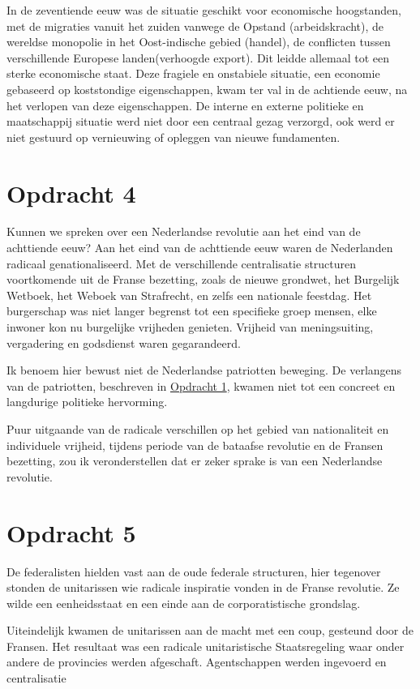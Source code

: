 \documentclass[11pt]{amsart}
\begin{document}
In de zeventiende eeuw was de situatie geschikt voor economische hoogstanden, met de migraties vanuit het zuiden vanwege de Opstand (arbeidskracht), de wereldse monopolie in het Oost-indische gebied (handel), de conflicten tussen verschillende Europese landen(verhoogde export). Dit leidde allemaal tot een sterke economische staat. Deze fragiele en onstabiele situatie, een economie gebaseerd op koststondige eigenschappen, kwam ter val in de achtiende eeuw, na het verlopen van deze eigenschappen. De interne en externe politieke en maatschappij situatie werd niet door een centraal gezag verzorgd, ook werd er niet gestuurd op vernieuwing of opleggen van nieuwe fundamenten.

\section*{Opdracht 4}
Kunnen we spreken over een Nederlandse revolutie aan het eind van de achttiende eeuw? Aan het eind van de achttiende eeuw waren de Nederlanden radicaal genationaliseerd. Met de verschillende centralisatie structuren voortkomende uit de Franse bezetting, zoals de nieuwe grondwet, het Burgelijk Wetboek, het Weboek van Strafrecht, en zelfs een nationale feestdag. Het burgerschap was niet langer begrenst tot een specifieke groep mensen, elke inwoner kon nu burgelijke vrijheden genieten. Vrijheid van meningsuiting, vergadering en godsdienst waren gegarandeerd.

Ik benoem hier bewust niet de Nederlandse patriotten beweging. De verlangens van de patriotten, beschreven in \hyperref[opdracht1]{Opdracht 1}, kwamen niet tot een concreet en langdurige politieke hervorming.

Puur uitgaande van de radicale verschillen op het gebied van nationaliteit en individuele vrijheid, tijdens periode van de bataafse revolutie en de Fransen bezetting, zou ik veronderstellen dat er zeker sprake is van een Nederlandse revolutie.

\section*{Opdracht 5}
De federalisten hielden vast aan de oude federale structuren, hier tegenover stonden de unitarissen wie radicale inspiratie vonden in de Franse revolutie.\autocite[200]{wielengaGeschiedenisVanNederland2022} Ze wilde een eenheidsstaat en een einde aan de corporatistische grondslag.\autocite[199]{wielengaGeschiedenisVanNederland2022}

Uiteindelijk kwamen de unitarissen aan de macht met een coup, gesteund door de Fransen.\autocite[200]{wielengaGeschiedenisVanNederland2022} Het resultaat was een radicale unitaristische Staatsregeling waar onder andere de provincies werden afgeschaft.\autocite[200]{wielengaGeschiedenisVanNederland2022} Agentschappen werden ingevoerd en centralisatie \autocite[200]{wielengaGeschiedenisVanNederland2022}





\printbibliography{}
\end{document}
